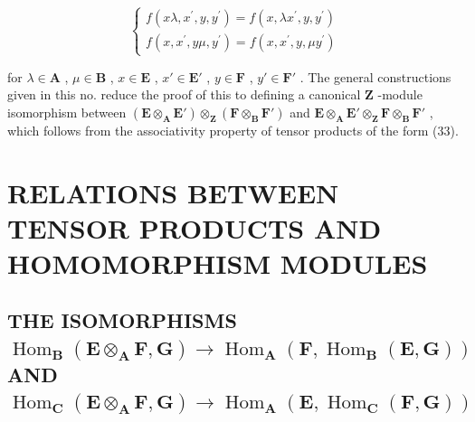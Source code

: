 \[
\left\{ \begin{array}{l} f (x \lambda , x ^ {\prime}, y, y ^ {\prime}) = f (x, \lambda x ^ {\prime}, y, y ^ {\prime}) \\ f (x, x ^ {\prime}, y \mu , y ^ {\prime}) = f (x, x ^ {\prime}, y, \mu y ^ {\prime}) \end{array} \right.\tag{38}
\]

for \(\lambda\in\mathbf{A}\) , \(\mu\in\mathbf{B}\) , \(x\in\mathbf{E}\) , \(x'\in\mathbf{E}'\) , \(y\in\mathbf{F}\) , \(y'\in\mathbf{F}'\) . The general constructions given in this no. reduce the proof of this to defining a canonical \(\mathbf{Z}\) -module isomorphism between \((\mathbf{E}\otimes_{\mathbf{A}}\mathbf{E}')\otimes_{\mathbf{Z}}(\mathbf{F}\otimes_{\mathbf{B}}\mathbf{F}')\) and \(\mathbf{E}\otimes_{\mathbf{A}}\mathbf{E}'\otimes_{\mathbf{Z}}\mathbf{F}\otimes_{\mathbf{B}}\mathbf{F}'\) , which follows from the associativity property of tensor products of the form (33).

\section{RELATIONS BETWEEN TENSOR PRODUCTS AND HOMOMORPHISM MODULES}

\subsection{\texorpdfstring{THE ISOMORPHISMS \(\operatorname{Hom}_{\mathbf{B}}(\mathbf{E} \otimes_{\mathbf{A}} \mathbf{F}, \mathbf{G}) \to \operatorname{Hom}_{\mathbf{A}}(\mathbf{F}, \operatorname{Hom}_{\mathbf{B}}(\mathbf{E}, \mathbf{G}))\) AND \(\operatorname{Hom}_{\mathbf{C}}(\mathbf{E} \otimes_{\mathbf{A}} \mathbf{F}, \mathbf{G}) \to \operatorname{Hom}_{\mathbf{A}}(\mathbf{E}, \operatorname{Hom}_{\mathbf{C}}(\mathbf{F}, \mathbf{G}))\)}{THE ISOMORPHISMS \textbackslash operatorname\{Hom\}\_\{\textbackslash mathbf\{B\}\}(\textbackslash mathbf\{E\} \textbackslash otimes\_\{\textbackslash mathbf\{A\}\} \textbackslash mathbf\{F\}, \textbackslash mathbf\{G\}) \textbackslash to \textbackslash operatorname\{Hom\}\_\{\textbackslash mathbf\{A\}\}(\textbackslash mathbf\{F\}, \textbackslash operatorname\{Hom\}\_\{\textbackslash mathbf\{B\}\}(\textbackslash mathbf\{E\}, \textbackslash mathbf\{G\})) AND \textbackslash operatorname\{Hom\}\_\{\textbackslash mathbf\{C\}\}(\textbackslash mathbf\{E\} \textbackslash otimes\_\{\textbackslash mathbf\{A\}\} \textbackslash mathbf\{F\}, \textbackslash mathbf\{G\}) \textbackslash to \textbackslash operatorname\{Hom\}\_\{\textbackslash mathbf\{A\}\}(\textbackslash mathbf\{E\}, \textbackslash operatorname\{Hom\}\_\{\textbackslash mathbf\{C\}\}(\textbackslash mathbf\{F\}, \textbackslash mathbf\{G\}))}}

